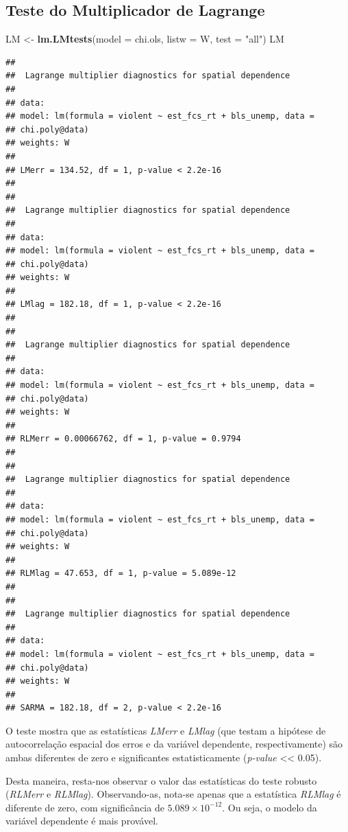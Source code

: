 \documentclass[12pt,]{article}
\newenvironment{Shaded}{\begin{snugshade}}{\end{snugshade}}
\newcommand{\KeywordTok}[1]{\textcolor[rgb]{0.13,0.29,0.53}{\textbf{#1}}}
\newcommand{\DataTypeTok}[1]{\textcolor[rgb]{0.13,0.29,0.53}{#1}}
\newcommand{\StringTok}[1]{\textcolor[rgb]{0.31,0.60,0.02}{#1}}
\newcommand{\NormalTok}[1]{#1}
\begin{document}
\subsection{Teste do Multiplicador de
Lagrange}\label{teste-do-multiplicador-de-lagrange-1}

\begin{Shaded}
\begin{Highlighting}[]
\NormalTok{LM <-}\StringTok{ }\KeywordTok{lm.LMtests}\NormalTok{(}\DataTypeTok{model =}\NormalTok{ chi.ols, }\DataTypeTok{listw =}\NormalTok{ W, }\DataTypeTok{test =} \StringTok{"all"}\NormalTok{)}
\NormalTok{LM}
\end{Highlighting}
\end{Shaded}

\begin{verbatim}
## 
##  Lagrange multiplier diagnostics for spatial dependence
## 
## data:  
## model: lm(formula = violent ~ est_fcs_rt + bls_unemp, data =
## chi.poly@data)
## weights: W
## 
## LMerr = 134.52, df = 1, p-value < 2.2e-16
## 
## 
##  Lagrange multiplier diagnostics for spatial dependence
## 
## data:  
## model: lm(formula = violent ~ est_fcs_rt + bls_unemp, data =
## chi.poly@data)
## weights: W
## 
## LMlag = 182.18, df = 1, p-value < 2.2e-16
## 
## 
##  Lagrange multiplier diagnostics for spatial dependence
## 
## data:  
## model: lm(formula = violent ~ est_fcs_rt + bls_unemp, data =
## chi.poly@data)
## weights: W
## 
## RLMerr = 0.00066762, df = 1, p-value = 0.9794
## 
## 
##  Lagrange multiplier diagnostics for spatial dependence
## 
## data:  
## model: lm(formula = violent ~ est_fcs_rt + bls_unemp, data =
## chi.poly@data)
## weights: W
## 
## RLMlag = 47.653, df = 1, p-value = 5.089e-12
## 
## 
##  Lagrange multiplier diagnostics for spatial dependence
## 
## data:  
## model: lm(formula = violent ~ est_fcs_rt + bls_unemp, data =
## chi.poly@data)
## weights: W
## 
## SARMA = 182.18, df = 2, p-value < 2.2e-16
\end{verbatim}

O teste mostra que as estatísticas \emph{LMerr} e \emph{LMlag} (que
testam a hipótese de autocorrelação espacial dos erros e da variável
dependente, respectivamente) são ambas diferentes de zero e
significantes estatisticamente (\emph{p-value} \textless{}\textless{}
0.05).

Desta maneira, resta-nos observar o valor das estatísticas do teste
robusto (\emph{RLMerr} e \emph{RLMlag}). Observando-as, nota-se apenas
que a estatística \emph{RLMlag} é diferente de zero, com significância
de \(5.089\times 10^{-12}\). Ou seja, o modelo da variável dependente é
mais provável.
\end{document}
